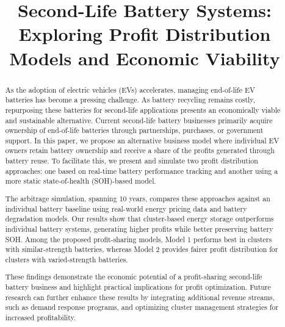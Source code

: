 \documentclass[conference]{IEEEtran}
\begin{document}
\title{Second-Life Battery Systems: Exploring Profit Distribution Models and Economic Viability\\
}

\author{
\and
{}
}

\maketitle

\begin{abstract}

As the  adoption of electric vehicles (EVs) accelerates, managing end-of-life EV batteries has become a pressing challenge.  As battery recycling remains costly, repurposing these batteries for second-life applications presents an economically viable and sustainable alternative. Current second-life battery businesses primarily acquire ownership of end-of-life batteries through partnerships, purchases, or government support. In this paper, we propose an alternative business model where individual EV owners retain battery ownership and receive a share of the profits generated through battery reuse. To facilitate this, we present and simulate  two profit distribution approaches: one based on real-time battery performance tracking and another using a more static state-of-health (SOH)-based model.

The arbitrage simulation, spanning 10 years, compares these approaches against an individual battery baseline using real-world energy pricing data and battery degradation models. Our results show that cluster-based energy storage outperforms individual battery systems, generating higher profits while better preserving battery SOH. Among the proposed profit-sharing models, Model 1 performs best in clusters with similar-strength batteries, whereas Model 2 provides fairer profit distribution for clusters with varied-strength batteries.

These findings demonstrate the economic potential of a profit-sharing second-life battery business and highlight practical implications for profit optimization. Future research can further enhance these results by integrating additional revenue streams, such as demand response programs, and optimizing cluster management strategies for increased profitability.

\end{abstract}
\end{document}
